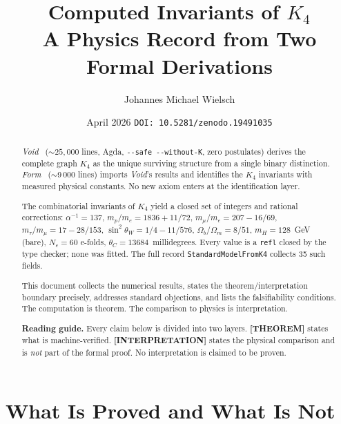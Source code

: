 \documentclass[11pt,a4paper]{article}
\title{%
  Computed Invariants of $K_4$\\[0.3em]
  \large A Physics Record from Two Formal Derivations}
\author{Johannes Michael Wielsch}
\date{April 2026 \quad\texttt{DOI: 10.5281/zenodo.19491035}}
\newcommand{\THEOREM}{\textcolor{blue!70!black}{\textbf{[THEOREM]}}}
\newcommand{\INTERP}{\textcolor{orange!80!black}{\textbf{[INTERPRETATION]}}}
\theoremstyle{definition}
\begin{document}
\maketitle

\begin{abstract}
\noindent
\textit{Void}~\cite{wielsch2026void} (${\sim}25{,}000$ lines, Agda,
\texttt{-{}-safe -{}-without-K}, zero postulates) derives the complete
graph $K_4$ as the unique surviving structure from a single binary distinction.
\textit{Form}~\cite{wielsch2026form} ($\sim$9\,000 lines) imports
\textit{Void}'s results and identifies the $K_4$ invariants with
measured physical constants.  No new axiom enters at the identification layer.

The combinatorial invariants of $K_4$ yield a closed set of integers and
rational corrections: $\alpha^{-1} = 137$, $m_p/m_e = 1836 + 11/72$,
$m_\mu/m_e = 207 - 16/69$, $m_\tau/m_\mu = 17 - 28/153$,
$\sin^2\theta_W = 1/4 - 11/576$, $\Omega_b/\Omega_m = 8/51$,
$m_H = 128$~GeV (bare), $N_e = 60$ e-folds, $\theta_C = 13684$~millidegrees.
Every value is a \texttt{refl} closed by the type checker; none was fitted.
The full record \texttt{StandardModelFromK4} collects 35 such fields.

This document collects the numerical results, states the
theorem/interpretation boundary precisely, addresses standard objections,
and lists the falsifiability conditions.
The computation is theorem.  The comparison to physics is interpretation.

\medskip\noindent
\textbf{Reading guide.}
Every claim below is divided into two layers.  \THEOREM{} states what is
machine-verified.  \INTERP{} states the physical comparison and is
\emph{not} part of the formal proof.  No interpretation is claimed to be
proven.
\end{abstract}

\section{What Is Proved and What Is Not}
\label{sec:boundary}
\end{document}
